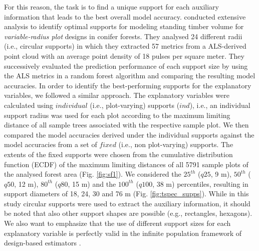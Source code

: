 For this reason, the task is to find a unique support for each auxiliary information that leads to the best overall model accuracy. \citet{deo2016} conducted extensive analysis to identify optimal supports for modeling standing timber volume for \textit{variable-radius plot} designs in conifer forests. They analysed 24 different radii (i.e., circular supports) in which they extracted 57 metrics from a ALS-derived point cloud with an average point density of 18 pulses per square meter. They successively evaluated the prediction performance of each support size by using the ALS metrics in a random forest algorithm and comparing the resulting model accuracies. In order to identify the best-performing supports for the explanatory variables, we followed a similar approach. The explanatory variables were calculated using $individual$ (i.e., plot-varying) supports ($ind$), i.e., an individual support radius was used for each plot according to the maximum limiting distance of all sample trees associated with the respective sample plot. We then compared the model accuracies derived under the individual supports against the model accuracies from a set of $fixed$ (i.e., non plot-varying) supports. The extents of the fixed supports were chosen from the cumulative distribution function (ECDF) of the maximum limiting distances of all 5791 sample plots of the analysed forest area (Fig. \ref{fig:sf1}). We considered the $25^{th}$ ($q25$, 9 m), $50^{th}$ ($q50$, 12 m), $80^{th}$ ($q80$, 15 m) and the $100^{th}$ ($q100$, 38 m) percentiles, resulting in support diameters of 18, 24, 30 and 76 m (Fig. \ref{fig:tspec_supps}). While in this study circular supports were used to extract the auxiliary information, it should be noted that also other support shapes are possible (e.g., rectangles, hexagons). We also want to emphasize that the use of different support sizes for each explanatory variable is perfectly valid in the infinite population framework of design-based estimators \citep{mandallaz2013c, mandallaz2013a}.



